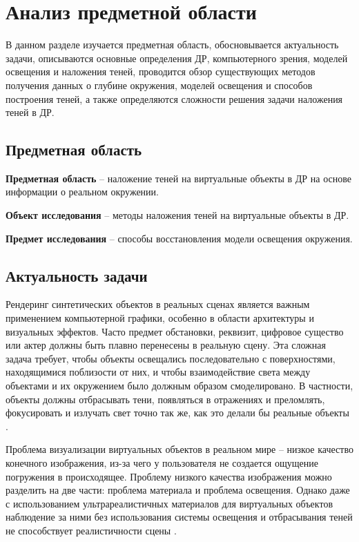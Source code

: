 \chapter{Анализ предметной области}

В данном разделе изучается предметная область, обосновывается актуальность задачи, описываются основные определения ДР, компьютерного зрения, моделей освещения и наложения теней, проводится обзор существующих методов получения данных о глубине окружения, моделей освещения и способов построения теней, а также определяются сложности решения задачи наложения теней в ДР.

\section{Предметная область}

\textbf{Предметная область} -- наложение теней  на виртуальные объекты в ДР на основе информации о реальном окружении.

\textbf{Объект исследования} -- методы наложения теней  на виртуальные объекты в ДР.

\textbf{Предмет исследования} -- способы восстановления модели освещения окружения.

\section{Актуальность задачи}

Рендеринг синтетических объектов в реальных сценах является важным применением компьютерной графики, особенно в области архитектуры и визуальных эффектов. Часто предмет обстановки, реквизит, цифровое существо или актер должны быть плавно перенесены в реальную сцену. Эта сложная задача требует, чтобы объекты освещались последовательно с поверхностями, находящимися поблизости от них, и чтобы взаимодействие света между объектами и их окружением было должным образом смоделировано. В частности, объекты должны отбрасывать тени, появляться в отражениях и преломлять, фокусировать и излучать свет точно так же, как это делали бы реальные объекты \cite{debevec2008rendering}.

Проблема визуализации виртуальных объектов в реальном мире -- низкое качество конечного изображения, из-за чего у пользователя не создается ощущение погружения в происходящее. Проблему низкого качества изображения можно разделить на две части: проблема материала и проблема освещения. Однако даже с использованием ультрареалистичных материалов для виртуальных объектов наблюдение за ними без использования системы освещения и отбрасывания теней не способствует реалистичности сцены \cite{osti2019real}.

